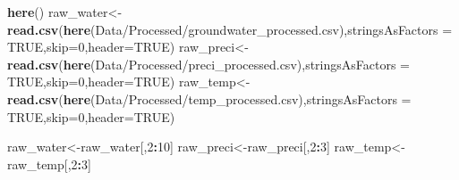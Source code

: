 \documentclass[
]{article}
\newenvironment{Shaded}{\begin{snugshade}}{\end{snugshade}}
\newcommand{\AttributeTok}[1]{\textcolor[rgb]{0.13,0.29,0.53}{#1}}
\newcommand{\CommentTok}[1]{\textcolor[rgb]{0.56,0.35,0.01}{\textit{#1}}}
\newcommand{\ConstantTok}[1]{\textcolor[rgb]{0.56,0.35,0.01}{#1}}
\newcommand{\DecValTok}[1]{\textcolor[rgb]{0.00,0.00,0.81}{#1}}
\newcommand{\FunctionTok}[1]{\textcolor[rgb]{0.13,0.29,0.53}{\textbf{#1}}}
\newcommand{\NormalTok}[1]{#1}
\newcommand{\OtherTok}[1]{\textcolor[rgb]{0.56,0.35,0.01}{#1}}
\newcommand{\SpecialCharTok}[1]{\textcolor[rgb]{0.81,0.36,0.00}{\textbf{#1}}}
\newcommand{\StringTok}[1]{\textcolor[rgb]{0.31,0.60,0.02}{#1}}
\begin{document}
\begin{Shaded}
\begin{Highlighting}[]
\FunctionTok{here}\NormalTok{()}
\NormalTok{raw\_water}\OtherTok{\textless{}{-}}\FunctionTok{read.csv}\NormalTok{(}\FunctionTok{here}\NormalTok{(}\StringTok{\textquotesingle{}Data/Processed/groundwater\_processed.csv\textquotesingle{}}\NormalTok{),}\AttributeTok{stringsAsFactors =} \ConstantTok{TRUE}\NormalTok{,}\AttributeTok{skip=}\DecValTok{0}\NormalTok{,}\AttributeTok{header=}\ConstantTok{TRUE}\NormalTok{)}
\NormalTok{raw\_preci}\OtherTok{\textless{}{-}}\FunctionTok{read.csv}\NormalTok{(}\FunctionTok{here}\NormalTok{(}\StringTok{\textquotesingle{}Data/Processed/preci\_processed.csv\textquotesingle{}}\NormalTok{),}\AttributeTok{stringsAsFactors =} \ConstantTok{TRUE}\NormalTok{,}\AttributeTok{skip=}\DecValTok{0}\NormalTok{,}\AttributeTok{header=}\ConstantTok{TRUE}\NormalTok{)}
\NormalTok{raw\_temp}\OtherTok{\textless{}{-}}\FunctionTok{read.csv}\NormalTok{(}\FunctionTok{here}\NormalTok{(}\StringTok{\textquotesingle{}Data/Processed/temp\_processed.csv\textquotesingle{}}\NormalTok{),}\AttributeTok{stringsAsFactors =} \ConstantTok{TRUE}\NormalTok{,}\AttributeTok{skip=}\DecValTok{0}\NormalTok{,}\AttributeTok{header=}\ConstantTok{TRUE}\NormalTok{)}

\NormalTok{raw\_water}\OtherTok{\textless{}{-}}\NormalTok{raw\_water[,}\DecValTok{2}\SpecialCharTok{:}\DecValTok{10}\NormalTok{]}
\NormalTok{raw\_preci}\OtherTok{\textless{}{-}}\NormalTok{raw\_preci[,}\DecValTok{2}\SpecialCharTok{:}\DecValTok{3}\NormalTok{]}
\NormalTok{raw\_temp}\OtherTok{\textless{}{-}}\NormalTok{raw\_temp[,}\DecValTok{2}\SpecialCharTok{:}\DecValTok{3}\NormalTok{]}
\end{Highlighting}
\end{Shaded}

\begin{Shaded}
\end{Shaded}
\end{document}
